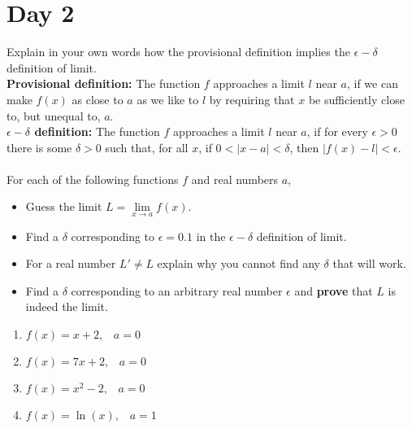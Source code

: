 \documentclass[11pt, a4paper, oneside]{amsart}
\begin{document}
\newpage\section*{Day 2}
\vspace{1em}

Explain in your own words how the provisional definition implies the $\epsilon-\delta$ definition of limit.\\


\textbf{Provisional definition:} The function $f$ approaches a limit $l$ near $a$, if we can make $f(x)$ as close to $a$ as we like to $l$ by requiring that $x$ be sufficiently close to, but unequal to, $a$.\\

\textbf{$\epsilon-\delta$ definition:} The function $f$ {approaches a limit} $l$ near $a$, if for every $\epsilon > 0$ there is some $\delta > 0$ such that, for all $x$, if $0 < |x - a| < \delta$, then $|f(x) - l| < \epsilon$.\\\\


For each of the following functions $f$ and real numbers $a$,
\begin{itemize}
	\item Guess the limit $L = \lim \limits _ {x \rightarrow a} f(x)$.
	\item Find a $\delta$ corresponding to $\epsilon = 0.1$ in the $\epsilon - \delta$ definition of limit.
	\item For a real number $L' \neq L$ explain why you cannot find any $\delta$ that will work.
	\item Find a $\delta$ corresponding to an arbitrary real number $\epsilon$ and \textbf{prove} that $L$ is indeed the limit.\\
\end{itemize}

\begin{enumerate}
	\item $f(x)=x+2, \hspace{10pt} a=0$
	\item $f(x)=7x+ 2, \hspace{10pt} a=0$
	\item $f(x)=x^2-2, \hspace{10pt} a=0$
	\item $f(x)=\ln(x), \hspace{10pt} a=1$
\end{enumerate}
\end{document}
